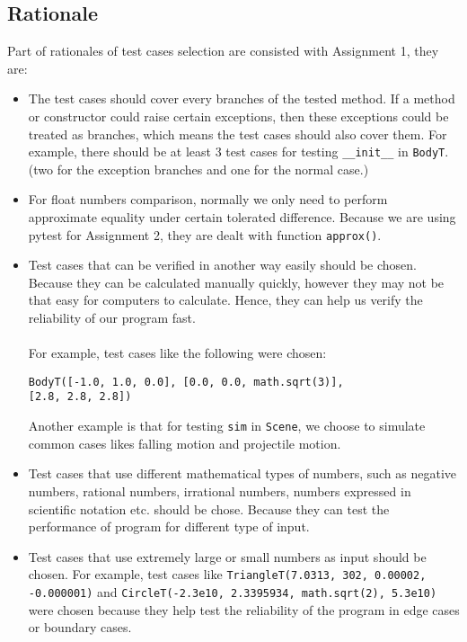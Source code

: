 \documentclass[12pt]{article}
\begin{document}
\subsection{Rationale}
Part of rationales of test cases selection are consisted with Assignment 1, they are: 
\begin{itemize}
\item The test cases should cover every branches of the tested method. If a method or constructor could raise certain exceptions, then these exceptions could be treated as branches, which means the test cases should also cover them. For example, there should be at least 3 test cases for testing \verb|__init__| in \verb|BodyT|. (two for the exception branches and one for the normal case.)
\item For float numbers comparison, normally we only need to perform approximate equality under certain tolerated difference. Because we are using pytest for Assignment 2, they are dealt with function \verb|approx()|.
\item Test cases that can be verified in another way easily should be chosen. Because they can be calculated manually quickly, however they may not be that easy for computers to calculate. Hence, they can help us verify the reliability of our program fast.\\\\
For example, test cases like the following were chosen:
\begin{lstlisting}
BodyT([-1.0, 1.0, 0.0], [0.0, 0.0, math.sqrt(3)], 
[2.8, 2.8, 2.8])
\end{lstlisting}
Another example is that for testing \verb|sim| in \verb|Scene|, we choose to simulate common cases likes falling motion and projectile motion.
\item Test cases that use different mathematical types of numbers, such as negative numbers, rational numbers, irrational numbers, numbers expressed in scientific notation etc. should be chose. Because they can test the performance of program for different type of input.
\item Test cases that use extremely large or small numbers as input should be chosen. For example, test cases like \verb|TriangleT(7.0313, 302, 0.00002, -0.000001)| and \verb|CircleT(-2.3e10, 2.3395934, math.sqrt(2), 5.3e10)| were chosen because they help test the reliability of the program in edge cases or boundary cases.
\end{itemize}
\end{document}
